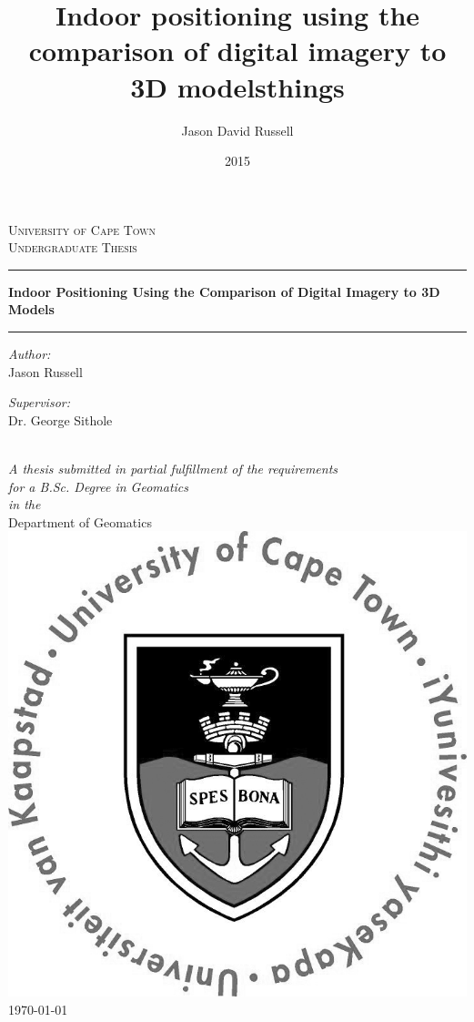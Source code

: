 \documentclass[11pt,a4paper]{report}
\title{Indoor positioning using the comparison of digital imagery to 3D models}
\date{2015}
\author{Jason David Russell}
\begin{document}
\begin{center}
	
	\textsc{\LARGE University of Cape Town}\\[1cm]
	\textsc{\Large Undergraduate Thesis}\\[0.5cm]
	
	\hrule
	\vspace{0.4cm}
	\title{things}
	{\huge \bfseries Indoor Positioning Using the Comparison of Digital Imagery to 3D Models }\\[0.4cm]
	\hrule
	\vspace{1cm}
	
	\begin{minipage}{0.4\textwidth}
		\begin{flushleft} \large
			\emph{Author:}\\
			\textnormal{Jason Russell}
		\end{flushleft}
	\end{minipage}
	\begin{minipage}{0.4\textwidth}
		\begin{flushright} \large
			\emph{Supervisor:} \\
			\textnormal{Dr. George Sithole}
		\end{flushright}
	\end{minipage}\\[1cm]
	
	\large \textit{A thesis submitted in partial fulfillment of the requirements\\ for a B.Sc. Degree in Geomatics}\\[0.3cm]
	\textit{in the}\\[0.4cm]
	Department of Geomatics\\[1.2cm]
	
	
	\includegraphics[scale=0.7]{uct_logo}\\[0.2cm]
	
	{\large \today}
	
\end{center}
\end{document}
